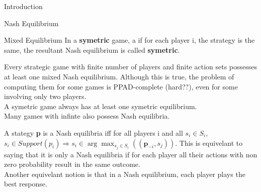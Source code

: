 \documentclass[12pt, letterpaper]{article}
\begin{document}
\begin{section}{Introduction}
\begin{subsection}{Nash Equilibrium}
\begin{subsubsection}{Mixed Equilibrium}
      In a \textbf{symetric} game, a if for each player i, the strategy is the
      same, the resultant Nash equilibrium is called \textbf{symetric}.

      Every strategic game with finite number of players and finite action sets
      possesses at least one mixed Nash equilibrium. Although this is true, the
      problem of computing them for some games is PPAD-complete (hard??), even
      for some involving only two players. \\
      A symetric game always has at least one symetric equilibrium. \\
      Many games with infinte also possess Nash equilibria.

      A stategy \textbf{p} is a Nash equilibria iff for all players i and all
      \(s_{i} \in S_{i}\), \(s_{i} \in Support(p_{i}) \Rightarrow s_{i} \in
      \arg \max_{s_{j} \in S_{i}}((\textbf{p}_{-i}, s_{j}))\). This is
      equivelant to saying that it is only a Nash equilibria if for each player
      all their actions with non zero probability result in the same outcome.
      \\
      Another equivelant notion is that in a Nash equilibrium, each player
      plays the best response.

    \end{subsubsection}

  \end{subsection}

\end{section}
\end{document}
